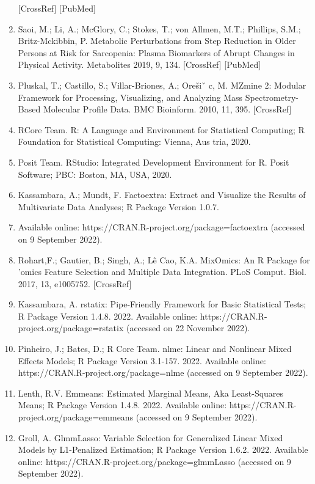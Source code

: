 \documentclass[journal=jacsat,manuscript=article]{achemso}
\begin{document}
\begin{enumerate}
  {[}CrossRef{]} {[}PubMed{]}
\item
  Saoi, M.; Li, A.; McGlory, C.; Stokes, T.; von Allmen, M.T.; Phillips,
  S.M.; Britz-Mckibbin, P. Metabolic Perturbations from Step Reduction
  in Older Persons at Risk for Sarcopenia: Plasma Biomarkers of Abrupt
  Changes in Physical Activity. Metabolites 2019, 9, 134. {[}CrossRef{]}
  {[}PubMed{]}
\item
  Pluskal, T.; Castillo, S.; Villar-Briones, A.; Orešiˇ c, M. MZmine 2:
  Modular Framework for Processing, Visualizing, and Analyzing Mass
  Spectrometry-Based Molecular Profile Data. BMC Bioinform. 2010, 11,
  395. {[}CrossRef{]}
\item
  RCore Team. R: A Language and Environment for Statistical Computing; R
  Foundation for Statistical Computing: Vienna, Aus tria, 2020.
\item
  Posit Team. RStudio: Integrated Development Environment for R. Posit
  Software; PBC: Boston, MA, USA, 2020.
\item
  Kassambara, A.; Mundt, F. Factoextra: Extract and Visualize the
  Results of Multivariate Data Analyses; R Package Version 1.0.7.
\item
  Available online: https://CRAN.R-project.org/package=factoextra
  (accessed on 9 September 2022).
\item
  Rohart,F.; Gautier, B.; Singh, A.; Lê Cao, K.A. MixOmics: An R Package
  for 'omics Feature Selection and Multiple Data Integration. PLoS
  Comput. Biol. 2017, 13, e1005752. {[}CrossRef{]}
\item
  Kassambara, A. rstatix: Pipe-Friendly Framework for Basic Statistical
  Tests; R Package Version 1.4.8. 2022. Available online:
  https://CRAN.R-project.org/package=rstatix (accessed on 22 November
  2022).
\item
  Pinheiro, J.; Bates, D.; R Core Team. nlme: Linear and Nonlinear Mixed
  Effects Models; R Package Version 3.1-157. 2022. Available online:
  https://CRAN.R-project.org/package=nlme (accessed on 9 September
  2022).
\item
  Lenth, R.V. Emmeans: Estimated Marginal Means, Aka Least-Squares
  Means; R Package Version 1.4.8. 2022. Available online:
  https://CRAN.R-project.org/package=emmeans (accessed on 9 September
  2022).
\item
  Groll, A. GlmmLasso: Variable Selection for Generalized Linear Mixed
  Models by L1-Penalized Estimation; R Package Version 1.6.2. 2022.
  Available online: https://CRAN.R-project.org/package=glmmLasso
  (accessed on 9 September 2022).

\end{enumerate}
\end{document}
